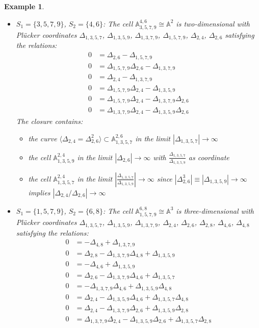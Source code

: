 \documentclass{amsart}
\newtheorem{example}[theorem]{Example}
\numberwithin{equation}{section}
\renewcommand{\AA}{\mathbb{A}}
\begin{document}
\begin{example}
\begin{itemize}
      \item $S_1=\{3,5,7,9\}$, $S_2=\{4,6\}$: The cell $\AA_{3,5,7,9}^{4,6} \cong \AA^2$ is two-dimensional with Pl\"ucker coordinates $\Delta_{1,3,5,7}$, $\Delta_{1,3,5,9}$, $\Delta_{1,3,7,9}$, $\Delta_{1,5,7,9}$, $\Delta_{2,4}$, $\Delta_{2,6}$ satisfying the relations:
        \begin{align*}
          0 &= \Delta_{2,6} - \Delta_{1,5,7,9}\\
          0 &= \Delta_{1,5,7,9}\Delta_{2,6} - \Delta_{1,3,7,9}\\
          0 &= \Delta_{2,4} - \Delta_{1,3,7,9}\\
          0 &= \Delta_{1,5,7,9}\Delta_{2,4} - \Delta_{1,3,5,9}\\
          0 &= \Delta_{1,5,7,9}\Delta_{2,4} - \Delta_{1,3,7,9}\Delta_{2,6}\\
          0 &= \Delta_{1,3,7,9}\Delta_{2,4} - \Delta_{1,3,5,9}\Delta_{2,6}
        \end{align*}
        The closure contains:
        \begin{itemize}
          \item the curve $\langle \Delta_{2,4}=\Delta_{2,6}^2 \rangle \subset \AA_{1,3,5,7}^{2,6}$ in the limit $|\Delta_{1,3,5,7}|\to\infty$
          \item the cell $\AA_{1,3,5,9}^{2,4}$ in the limit $|\Delta_{2,6}|\to\infty$ with $\frac{\Delta_{1,3,5,7}}{\Delta_{1,3,5,9}}$ as coordinate
          \item the cell $\AA_{1,3,5,7}^{2,4}$ in the limit $|\frac{\Delta_{1,3,5,7}}{\Delta_{1,3,5,9}}|\to\infty$ since $|\Delta_{2,6}^3|\equiv|\Delta_{1,3,5,9}|\to\infty$ implies $|\Delta_{2,4}/\Delta_{2,6}|\to\infty$
        \end{itemize}

      \item $S_1=\{1,5,7,9\}$, $S_2=\{6,8\}$: The cell $\AA_{1,5,7,9}^{6,8} \cong \AA^3$ is three-dimensional with Pl\"ucker coordinates $\Delta_{1,3,5,7}$, $\Delta_{1,3,5,9}$, $\Delta_{1,3,7,9}$, $\Delta_{2,4}$, $\Delta_{2,6}$, $\Delta_{2,8}$, $\Delta_{4,6}$, $\Delta_{4,8}$ satisfying the relations:
      \begin{align*}
        0 &= -\Delta_{4,8} + \Delta_{1,3,7,9}\\
        0 &= \Delta_{2,8} - \Delta_{1,3,7,9}\Delta_{4,8} + \Delta_{1,3,5,9}\\
        0 &= -\Delta_{4,6} + \Delta_{1,3,5,9}\\
        0 &= \Delta_{2,6} - \Delta_{1,3,7,9}\Delta_{4,6} + \Delta_{1,3,5,7}\\
        0 &= - \Delta_{1,3,7,9}\Delta_{4,6} + \Delta_{1,3,5,9}\Delta_{4,8}\\
        0 &= \Delta_{2,4} - \Delta_{1,3,5,9}\Delta_{4,6} + \Delta_{1,3,5,7}\Delta_{4,8}\\
        0 &= \Delta_{2,4} - \Delta_{1,3,7,9}\Delta_{2,6} + \Delta_{1,3,5,9}\Delta_{2,8}\\
        0 &= \Delta_{1,3,7,9}\Delta_{2,4} - \Delta_{1,3,5,9}\Delta_{2,6} + \Delta_{1,3,5,7}\Delta_{2,8}
      \end{align*}


\end{itemize}
\end{example}
\end{document}
